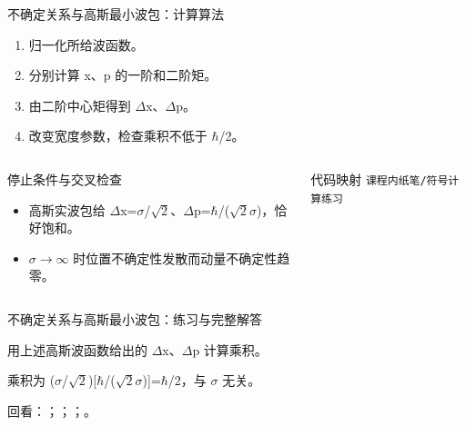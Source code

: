 \begin{frame}[t]{不确定关系与高斯最小波包：计算算法}
\footnotesize
{}\begin{enumerate}
\item 归一化所给波函数。
\item 分别计算 x、p 的一阶和二阶矩。
\item 由二阶中心矩得到 \ensuremath{\Delta}x、\ensuremath{\Delta}p。
\item 改变宽度参数，检查乘积不低于 \ensuremath{\hbar}/\allowbreak{}2。
\end{enumerate}\begin{columns}[T,onlytextwidth]
\begin{block}{停止条件与交叉检查}\scriptsize\begin{itemize}
\item[\CheckMark] 高斯实波包给 \ensuremath{\Delta}x=\ensuremath{\sigma}/\allowbreak{}\ensuremath{\sqrt{2}}、\ensuremath{\Delta}p=\ensuremath{\hbar}/\allowbreak{}(\ensuremath{\sqrt{2}}\ensuremath{\sigma})，恰好饱和。
\item[\CheckMark] \ensuremath{\sigma}\ensuremath{\rightarrow}\ensuremath{\infty} 时位置不确定性发散而动量不确定性趋零。
\end{itemize}\end{block}
\begin{block}{代码映射}
\scriptsize \texttt{课程内纸笔/\allowbreak{}符号计算练习}
\end{block}\end{columns}\end{frame}

\begin{frame}[t]{不确定关系与高斯最小波包：练习与完整解答}
\footnotesize
\begin{block}{}用上述高斯波函数给出的 \ensuremath{\Delta}x、\ensuremath{\Delta}p 计算乘积。\end{block}
\begin{exampleblock}{}乘积为 (\ensuremath{\sigma}/\allowbreak{}\ensuremath{\sqrt{2}})[\ensuremath{\hbar}/\allowbreak{}(\ensuremath{\sqrt{2}}\ensuremath{\sigma})]=\ensuremath{\hbar}/\allowbreak{}2，与 \ensuremath{\sigma} 无关。\end{exampleblock}
\vfill
\scriptsize 回看：；；；。
\end{frame}

